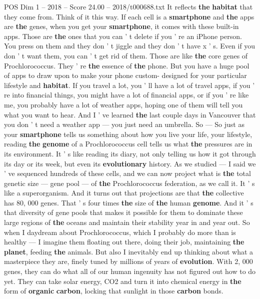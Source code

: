 \begin{textsample}{POS Dim 1 – 2018 – Score 24.00 – 2018/t000688.txt}
It reflects \textbf{the} \textbf{habitat} that they come from.
Think of it this way.
If each cell is a \textbf{smartphone} and \textbf{the} apps are \textbf{the} genes, when you get your \textbf{smartphone}, it comes with these built-in apps.
Those are \textbf{the} ones that you can ' t delete if you ' re an iPhone person.
You press on them and they don ' t jiggle and they don ' t have x ' s.
Even if you don ' t want them, you can ' t get rid of them.
Those are like \textbf{the} core genes of Prochlorococcus.
They ' re \textbf{the} essence of \textbf{the} phone.
But you have a huge pool of apps to draw upon to make your phone custom- designed for your particular lifestyle and \textbf{habitat}.
If you travel a lot, you ' ll have a lot of travel apps, if you ' re into financial things, you might have a lot of financial apps, or if you ' re like me, you probably have a lot of weather apps, hoping one of them will tell you what you want to hear.
And I ' ve learned \textbf{the} last couple days in Vancouver that you don ' t need a weather app — you just need an umbrella.
So — So just as your \textbf{smartphone} tells us something about how you live your life, your lifestyle, reading \textbf{the} \textbf{genome} of a Prochlorococcus cell tells us what \textbf{the} pressures are in its environment.
It ' s like reading its diary, not only telling us how it got through its day or its week, but even its \textbf{evolutionary} history.
As we studied — I said we ' ve sequenced hundreds of these cells, and we can now project what is \textbf{the} total genetic size — gene pool — of \textbf{the} Prochlorococcus federation, as we call it.
It ' s like a superorganism.
And it turns out that projections are that \textbf{the} collective has 80, 000 genes.
That ' s four times \textbf{the} size of \textbf{the} human \textbf{genome}.
And it ' s that diversity of gene pools that makes it possible for them to dominate these large regions of \textbf{the} oceans and maintain their stability year in and year out.
So when I daydream about Prochlorococcus, which I probably do more than is healthy — I imagine them floating out there, doing their job, maintaining \textbf{the} \textbf{planet}, feeding \textbf{the} animals.
But also I inevitably end up thinking about what a masterpiece they are, finely tuned by millions of years of \textbf{evolution}.
With 2, 000 genes, they can do what all of our human ingenuity has not figured out how to do yet.
They can take solar energy, CO2 and turn it into chemical energy in \textbf{the} form of \textbf{organic} \textbf{carbon}, locking that sunlight in those \textbf{carbon} bonds.

\end{textsample}
